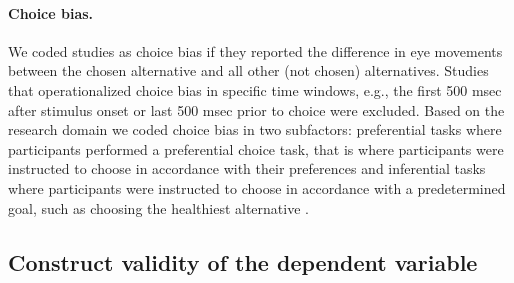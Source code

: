 \paragraph{Choice bias.} We coded studies as choice bias if they reported the difference in eye movements between the chosen alternative and all other (not chosen) alternatives. Studies that operationalized choice bias in specific time windows, e.g., the first 500 msec after stimulus onset or last 500 msec prior to choice \citep{shimojo2003a} were excluded. Based on the research domain we coded choice bias in two subfactors: preferential tasks where participants performed a preferential choice task, that is where participants were instructed to choose in accordance with their preferences \citep{schotter2010a} and inferential tasks where participants were instructed to choose in accordance with a predetermined goal, such as choosing the healthiest alternative \citep{schotter2012a}.


\subsection{Construct validity of the dependent variable}

